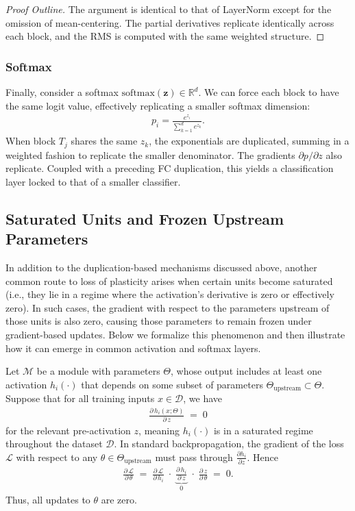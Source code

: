 \documentclass[11pt]{article}
\begin{document}
\begin{proof}[Proof Outline]
The argument is identical to that of LayerNorm except for the omission of mean-centering. The partial derivatives replicate identically across each block, and the RMS is computed with the same weighted structure.
\end{proof}

\subsubsection{Softmax}
Finally, consider a softmax $\mathrm{softmax}(\mathbf{z})\in\mathbb{R}^d$. We can force each block to have the same logit value, effectively replicating a smaller softmax dimension:
\begin{align*}
  p_i 
  =
  \frac{e^{z_i}}{\sum_{k=1}^d e^{z_k}}.
\end{align*}
When block $T_j$ shares the same $z_k$, the exponentials are duplicated, summing in a weighted fashion to replicate the smaller denominator. The gradients $\partial p/\partial z$ also replicate. Coupled with a preceding FC duplication, this yields a classification layer locked to that of a smaller classifier.

\subsection{Saturated Units and Frozen Upstream Parameters}
In addition to the duplication-based mechanisms discussed above, another common route to loss of plasticity arises when certain units become saturated (i.e., they lie in a regime where the activation's derivative is zero or effectively zero). In such cases, the gradient with respect to the parameters upstream of those units is also zero, causing those parameters to remain frozen under gradient-based updates. Below we formalize this phenomenon and then illustrate how it can emerge in common activation and softmax layers.

Let $\mathcal{M}$ be a module with parameters $\Theta$, whose output includes at least one activation $h_i(\cdot)$ that depends on some subset of parameters $\Theta_{\text{upstream}} \subset \Theta$. Suppose that for all training inputs $x\in \mathcal{D}$, we have
\begin{align*}
\frac{\partial \,h_i(x;\Theta)}{\partial \,z} \;=\; 0
\end{align*}
for the relevant pre-activation $z$, meaning $h_i(\cdot)$ is in a saturated regime throughout the dataset $\mathcal{D}$. In standard backpropagation, the gradient of the loss $\mathcal{L}$ with respect to any $\theta \in \Theta_{\text{upstream}}$ must pass through $\frac{\partial h_i}{\partial z}$. Hence
\begin{align*}
\frac{\partial \,\mathcal{L}}{\partial \,\theta}
\;=\;
\frac{\partial \,\mathcal{L}}{\partial \,h_i}
\;\cdot\;
\underbrace{
\frac{\partial \,h_i}{\partial \,z}
}_{0}
\;\cdot\;
\frac{\partial \,z}{\partial \,\theta}
\;=\; 0.
\end{align*}
Thus, all updates to $\theta$ are zero.
\end{document}
